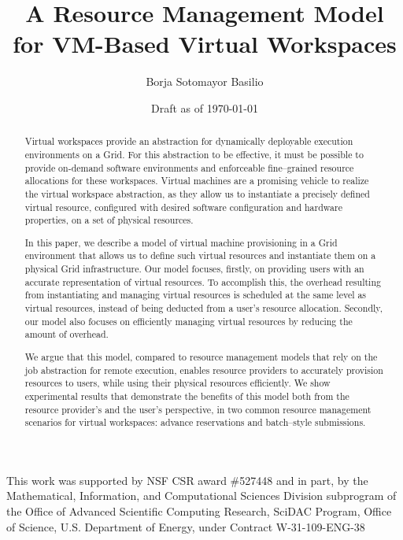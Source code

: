 \documentclass[singlespace]{ccw_chithesis}
\begin{document}
\title{A Resource Management Model for VM-Based Virtual Workspaces}
\author{Borja Sotomayor Basilio}
\date{Draft as of \today}
\maketitle

\begin{abstract}
Virtual workspaces provide an abstraction for dynamically deployable execution environments on a Grid. For this abstraction to be effective, it must be possible to provide on-demand software environments and enforceable fine--grained resource allocations for these workspaces. Virtual machines are a promising vehicle to realize the virtual workspace abstraction, as they allow us to instantiate a precisely defined virtual resource, configured with desired software configuration and hardware properties, on a set of physical resources.

In this paper, we describe a model of virtual machine provisioning in a Grid environment that allows us to define such virtual resources and instantiate them on a physical Grid infrastructure. Our model focuses, firstly, on providing users with an accurate representation of virtual resources. To accomplish this, the overhead resulting from instantiating and managing virtual resources is scheduled at the same level as virtual resources, instead of being deducted from a user's resource allocation. Secondly, our model also focuses on efficiently managing virtual resources by reducing the amount of overhead.

We argue that this model, compared to resource management models that rely on the job abstraction for remote execution, enables resource providers to accurately provision resources to users, while using their physical resources efficiently. We show experimental results that demonstrate the benefits of this model both from the resource provider's and the user's perspective, in two common resource management scenarios for virtual workspaces: advance reservations and batch--style submissions.
\end{abstract}

\acknowledgments
This work was supported by NSF CSR award \#527448 and in part, by the
Mathematical, Information, and Computational Sciences Division
subprogram of the Office of Advanced Scientific Computing Research,
SciDAC Program, Office of Science, U.S. Department of Energy, under
Contract W{}-31{}-109{}-ENG{}-38
\end{document}
